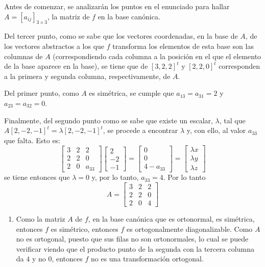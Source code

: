 \begin{solucion}
 Antes de comenzar, se analizar\'an los puntos en el enunciado para hallar $A=[a_{ij}]_{3\times 3}$, la matriz de $f$ en la base can\'onica.
 \par 
 Del tercer punto, como se sabe que los vectores coordenadas, en la base de $A$, de los vectores abstractos a los que $f$ transforma los elementos de esta base son las columnas de $A$ (correspondiendo cada columna a la posici\'on en el que el elemento de la base aparece en la base), se tiene que de $[3,2,2]^t$ y $[2,2,0]^t$ corresponden a la primera y segunda columna, respectivamente, de $A$.
 \par 
 Del primer punto, como $A$ es sim\'etrica, se cumple que $a_{13} = a_{31} = 2$ y $a_{23} = a_{32} = 0$.
 \par 
 Finalmente, del segundo punto como se sabe que existe un escalar, $\lambda$, tal que $A[2,-2,-1]^t = \lambda[2,-2,-1]^t$, se procede a encontrar $\lambda$ y, con ello, al valor $a_{33}$ que falta. Esto es:
 \begin{equation*}
  \begin{bmatrix}
   3 & 2 & 2 \\
   2 & 2 & 0 \\
   2 & 0 & a_{33}
  \end{bmatrix}
  \begin{bmatrix}
   2 \\ -2 \\ -1
  \end{bmatrix}
  = 
  \begin{bmatrix}
   0 \\ 0 \\ 4 - a_{33}
  \end{bmatrix}
  = 
  \begin{bmatrix}
   \lambda x \\ \lambda y \\ \lambda z
  \end{bmatrix}
 \end{equation*}
 se tiene entonces que $\lambda = 0$ y, por lo tanto, $a_{33} = 4$.
 Por lo tanto
 \begin{equation*}
  A = 
  \begin{bmatrix}
   3 & 2 & 2 \\
   2 & 2 & 0 \\
   2 & 0 & 4
  \end{bmatrix}
 \end{equation*}

 \begin{enumerate}[$a$)]
  \item Como la matriz $A$ de $f$, en la base can\'onica que es ortonormal, es sim\'etrica, entonces $f$ es sim\'etrico, entonces $f$ es ortogonalmente diagonalizable. Como $A$ no es ortogonal, puesto que sus filas no son ortonormales, lo cual se puede verificar viendo que el producto punto de la segunda con la tercera columna da $4$ y no $0$, entonces $f$ no es una transformaci\'on ortogonal.
  

\end{enumerate}
\end{solucion}
